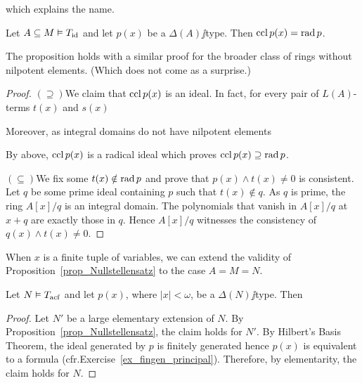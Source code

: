 \documentclass[creche.tex]{subfiles}
\begin{document}

which explains the name.



\begin{proposition}\label{prop_chiusura-radicale}
Let $A\subseteq M\models T_{\rm id}$ and let $p(x)$ be a $\Delta(A)\jj$type. Then $\ccl\,p(x)=\rad p$.
\end{proposition}
The proposition holds with a similar proof for the broader class of rings without nilpotent elements. (Which does not come as a surprise.)
\begin{proof}
$(\supseteq)$\quad We claim that $\ccl\,p(x)$ is an ideal. In fact, for every pair of $L(A)$-terms $t(x)$ and $s(x)$



Moreover, as integral domains do not have nilpotent elements


By \ssf{\#} above, $\ccl\,p(x)$ is a radical ideal which proves $\ccl\,p(x)\supseteq \rad p$.

$(\subseteq)$\quad We fix some $t(x)\notin\rad p$ and prove that $p(x)\wedge t(x)\neq0$ is consistent. Let $q$ be some prime ideal containing $p$ such that $t(x)\notin q$.  As $q$ is prime, the ring $A[x]/q$ is an integral domain. The polynomials that vanish in  $A[x]/q$ at $x+q$ are exactly those in $q$. Hence $A[x]/q$ witnesses the consistency of $q(x)\wedge t(x)\neq0$.
\end{proof}

When $x$ is a finite tuple of variables, we can extend the validity of Proposition~\ref{prop_Nullstellensatz} to the case $A=M=N$.

\begin{corollary}\label{coroll_Nullstellensatz}
Let $N\models T_{\rm acf}$ and let $p(x)$, where $|x|<\omega$, be a $\Delta(N)\jj$type. Then


\end{corollary}



\begin{proof}
Let $N'$ be a large elementary extension of $N$. By Proposition~\ref{prop_Nullstellensatz}, the claim holds for $N'$. By Hilbert's Basis Theorem, the ideal generated by $p$ is finitely generated hence $p(x)$ is equivalent to a formula (cfr.\@ Exercise~\ref{ex_fingen_principal}). Therefore, by elementarity, the claim holds for $N$.
\end{proof}
\end{document}
